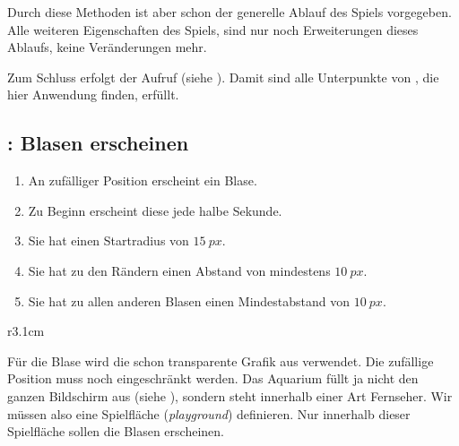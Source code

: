 

Durch diese Methoden ist aber schon der generelle Ablauf des Spiels vorgegeben. Alle weiteren Eigenschaften des Spiels, sind nur noch Erweiterungen dieses Ablaufs, keine Veränderungen mehr. 

Zum Schluss erfolgt der Aufruf (siehe ). 
Damit sind alle Unterpunkte von , die hier Anwendung finden, erfüllt.


\subsection{: Blasen erscheinen}

\begin{enumerate}
    \item An zufälliger Position erscheint ein Blase.\label{reqBlasenErscheinenZufall}
    \item Zu Beginn erscheint diese jede halbe Sekunde.\label{reqBlasenErscheinenIntervall}
    \item Sie hat einen Startradius von $15~px$.\label{reqBlasenErscheinenRadius}
    \item Sie hat zu den Rändern einen Abstand von mindestens $10~px$.\label{reqBlasenErscheinenAbstand}
    \item Sie hat zu allen anderen Blasen einen Mindestabstand von $10~px$.\label{reqBlasenErscheinenMindestabstand}
\end{enumerate}
\er


\begin{wrapfigure}[6]{r}{3.1cm}%
	\begin{center}%
		\vspace{-1cm}%
	\end{center}%
\end{wrapfigure}%
Für die Blase wird die schon transparente Grafik aus  verwendet. Die zufällige Position muss noch eingeschränkt werden. Das Aquarium füllt ja nicht den ganzen Bildschirm aus (siehe ), sondern steht innerhalb einer Art Fernseher. Wir müssen also eine Spielfläche (\emph{playground}) definieren. Nur innerhalb dieser Spielfläche sollen die Blasen erscheinen.

